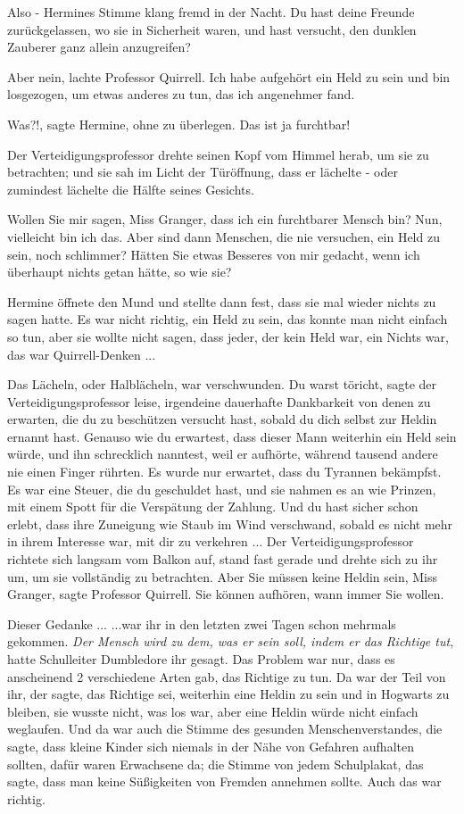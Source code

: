 \glqq{}Also -\grqq{} Hermines Stimme klang fremd in der Nacht. \glqq{}Du hast
deine Freunde zurückgelassen, wo sie in Sicherheit waren, und hast versucht, den
dunklen Zauberer ganz allein anzugreifen?\grqq{}

\glqq{}Aber nein\grqq{}, lachte Professor Quirrell. \glqq{}Ich habe aufgehört ein
Held zu sein und bin losgezogen, um etwas anderes zu tun, das ich angenehmer
fand.\grqq{}

\glqq{}Was?!\grqq{}, sagte Hermine, ohne zu überlegen. \glqq{}Das ist ja
furchtbar!\grqq{}

Der Verteidigungsprofessor drehte seinen Kopf vom Himmel herab, um sie zu
betrachten; und sie sah im Licht der Türöffnung, dass er lächelte - oder
zumindest lächelte die Hälfte seines Gesichts.

\glqq{}Wollen Sie mir sagen, Miss Granger, dass ich ein furchtbarer Mensch bin?
Nun, vielleicht bin ich das. Aber sind dann Menschen, die nie versuchen, ein
Held zu sein, noch schlimmer? Hätten Sie etwas Besseres von mir gedacht, wenn
ich überhaupt nichts getan hätte, so wie sie?\grqq{}

Hermine öffnete den Mund und stellte dann fest, dass sie mal wieder nichts zu
sagen hatte. Es war nicht richtig, ein Held zu sein, das konnte man nicht
einfach so tun, aber sie wollte nicht sagen, dass jeder, der kein Held war, ein
Nichts war, das war Quirrell-Denken ...

Das Lächeln, oder Halblächeln, war verschwunden. \glqq{}Du warst töricht\grqq{},
sagte der Verteidigungsprofessor leise, \glqq{}irgendeine dauerhafte Dankbarkeit
von denen zu erwarten, die du zu beschützen versucht hast, sobald du dich selbst
zur Heldin ernannt hast. Genauso wie du erwartest, dass dieser Mann weiterhin
ein Held sein würde, und ihn schrecklich nanntest, weil er aufhörte, während
tausend andere nie einen Finger rührten. Es wurde nur erwartet, dass du Tyrannen
bekämpfst. Es war eine Steuer, die du geschuldet hast, und sie nahmen es an wie
Prinzen, mit einem Spott für die Verspätung der Zahlung. Und du hast sicher
schon erlebt, dass ihre Zuneigung wie Staub im Wind verschwand, sobald es nicht
mehr in ihrem Interesse war, mit dir zu verkehren ...\grqq{} Der
Verteidigungsprofessor richtete sich langsam vom Balkon auf, stand fast gerade
und drehte sich zu ihr um, um sie vollständig zu betrachten. \glqq{}Aber Sie
müssen keine Heldin sein, Miss Granger\grqq{}, sagte Professor Quirrell. \glqq{}
Sie können aufhören, wann immer Sie wollen.\grqq{}

Dieser Gedanke ... ...war ihr in den letzten zwei Tagen schon mehrmals gekommen.
\emph{Der Mensch wird zu dem, was er sein soll, indem er das Richtige tut},
hatte Schulleiter Dumbledore ihr gesagt. Das Problem war nur, dass es
anscheinend 2 verschiedene Arten gab, das Richtige zu tun. Da war der Teil von
ihr, der sagte, das Richtige sei, weiterhin eine Heldin zu sein und in Hogwarts
zu bleiben, sie wusste nicht, was los war, aber eine Heldin würde nicht einfach
weglaufen. Und da war auch die Stimme des gesunden Menschenverstandes, die
sagte, dass kleine Kinder sich niemals in der Nähe von Gefahren aufhalten
sollten, dafür waren Erwachsene da; die Stimme von jedem Schulplakat, das sagte,
dass man keine Süßigkeiten von Fremden annehmen sollte. Auch das war richtig.

